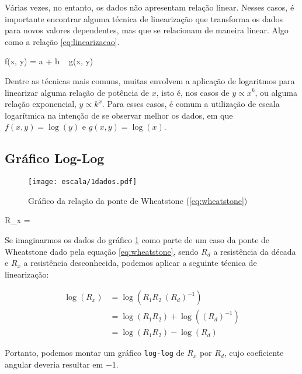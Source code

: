 Várias vezes, no entanto, os dados não apresentam relação linear. Nesses casos, é importante encontrar alguma técnica de linearização que transforma os dados para novos valores dependentes, mas que se relacionam de maneira linear. Algo como a relação \ref{eq:linearizacao}.

\begin{equacao} \label{eq:linearizacao}
    f(x, y) = a + b ~ g(x, y)
\end{equacao}

Dentre as técnicas mais comuns, muitas envolvem a aplicação de logaritmos para linearizar alguma relação de potência de $x$, isto é, nos casos de $y \propto x^k$, ou alguma relação exponencial, $y \propto k^x$. Para esses casos, é comum a utilização de escala logarítmica na intenção de se observar melhor os dados, em que $f(x, y) = \log(y)$ e $g(x, y) = \log(x)$.


\subsection{Gráfico Log-Log}

    \begin{figure}[htbp]
        \centering
        \texttt{[image: escala/1dados.pdf]}

        \caption{Gráfico da relação da ponte de Wheatstone (\ref{eq:wheatstone})}
        \label{fig:escala:loglog:dados}
    \end{figure}

    \begin{equacao} \label{eq:wheatstone}
        R_x = 
    \end{equacao}

    Se imaginarmos os dados do gráfico \ref{fig:escala:loglog:dados} como parte de um caso da ponte de Wheatstone dado pela equação \ref{eq:wheatstone}, sendo $R_d$ a resistência da década e $R_x$ a resistência desconhecida, podemos aplicar a seguinte técnica de linearização:

    \begin{align*}
        \log(R_x)
            &= \log\left(R_1 R_2 ~ (R_d)^{-1}\right) \\
            &= \log(R_1 R_2) + \log\left((R_d)^{-1}\right) \\
            &= \log(R_1 R_2) - \log(R_d)
    \end{align*}

    Portanto, podemos montar um gráfico \texttt{log-log} de $R_x$ por $R_d$, cujo coeficiente angular deveria resultar em $-1$.

